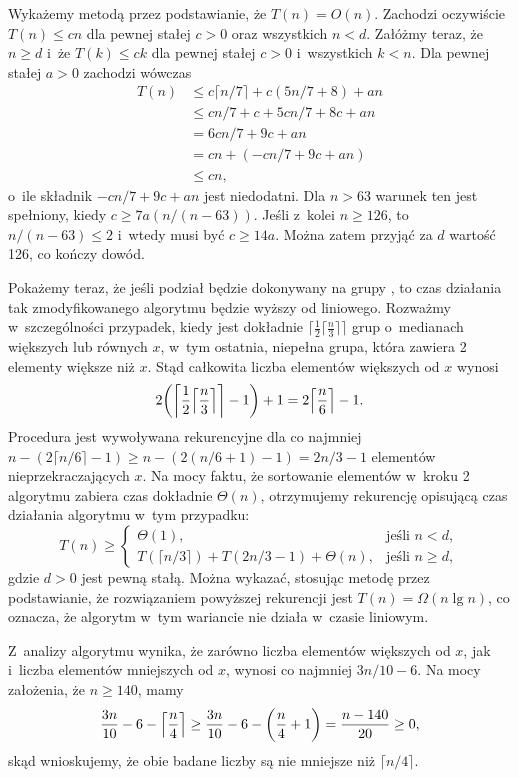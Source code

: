 Wykażemy metodą przez podstawianie, że $T(n)=O(n)$. Zachodzi oczywiście $T(n)\le cn$ dla pewnej stałej $c>0$ oraz wszystkich $n<d$. Załóżmy teraz, że $n\ge d$ i~że $T(k)\le ck$ dla pewnej stałej $c>0$ i~wszystkich $k<n$. Dla pewnej stałej $a>0$ zachodzi wówczas
\begin{align*}
	T(n) &\le c\lceil n/7\rceil+c(5n/7+8)+an \\
	&\le cn/7+c+5cn/7+8c+an \\
	&= 6cn/7+9c+an \\
	&= cn+(-cn/7+9c+an) \\
	&\le cn,
\end{align*}
o~ile składnik $-cn/7+9c+an$ jest niedodatni. Dla $n>63$ warunek ten jest spełniony, kiedy $c\ge7a(n/(n-63))$. Jeśli z~kolei $n\ge126$, to $n/(n-63)\le2$ i~wtedy musi być $c\ge14a$. Można zatem przyjąć za $d$ wartość 126, co kończy dowód.

Pokażemy teraz, że jeśli podział będzie dokonywany na grupy , to czas działania tak zmodyfikowanego algorytmu  będzie wyższy od liniowego. Rozważmy w~szczególności przypadek, kiedy jest dokładnie $\bigl\lceil\frac{1}{2}\bigl\lceil\frac{n}{3}\bigr\rceil\bigr\rceil$ grup o~medianach większych lub równych $x$, w~tym ostatnia, niepełna grupa, która zawiera 2 elementy większe niż $x$. Stąd całkowita liczba elementów większych od $x$ wynosi
\[
	2\biggl(\biggl\lceil\frac{1}{2}\Bigl\lceil\frac{n}{3}\Bigr\rceil\biggr\rceil-1\biggr)+1 = 2\Bigl\lceil\frac{n}{6}\Bigr\rceil-1.
\]
Procedura jest wywoływana rekurencyjne dla co najmniej $n-(2\lceil n/6\rceil-1)\ge n-(2(n/6+1)-1)=2n/3-1$ elementów nieprzekraczających $x$. Na mocy faktu, że sortowanie elementów w~kroku 2 algorytmu  zabiera czas dokładnie $\Theta(n)$, otrzymujemy rekurencję opisującą czas działania algorytmu w~tym przypadku:
\[
	T(n) \ge \begin{cases}
		\Theta(1), & \text{jeśli $n<d$}, \\
		T(\lceil n/3\rceil)+T(2n/3-1)+\Theta(n), & \text{jeśli $n\ge d$},
	\end{cases}
\]
gdzie $d>0$ jest pewną stałą. Można wykazać, stosując metodę przez podstawianie, że rozwiązaniem powyższej rekurencji jest $T(n)=\Omega(n\lg n)$, co oznacza, że algorytm w~tym wariancie nie działa w~czasie liniowym.

\exercise %
Z~analizy algorytmu  wynika, że zarówno liczba elementów większych od $x$, jak i~liczba elementów mniejszych od $x$, wynosi co najmniej $3n/10-6$. Na mocy założenia, że $n\ge140$, mamy
\[
	\frac{3n}{10}-6-\Bigl\lceil\frac{n}{4}\Bigr\rceil \ge \frac{3n}{10}-6-\biggl(\frac{n}{4}+1\biggr) = \frac{n-140}{20} \ge 0,
\]
skąd wnioskujemy, że obie badane liczby są nie mniejsze niż $\lceil n/4\rceil$.

